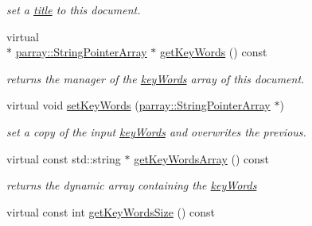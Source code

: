 \begin{DoxyCompactItemize}
\begin{DoxyCompactList}\small\item\em set a \hyperlink{classdocs_1_1Document_a419e4470c20e1bddd60448ba430f4738}{title} to this document. \end{DoxyCompactList}\item 
\hypertarget{classdocs_1_1Document_a500da2818240e2b29c1e4510b8724f4f}{virtual \\*
\hyperlink{classparray_1_1StringPointerArray}{parray\-::\-String\-Pointer\-Array} $\ast$ \hyperlink{classdocs_1_1Document_a500da2818240e2b29c1e4510b8724f4f}{get\-Key\-Words} () const }\label{classdocs_1_1Document_a500da2818240e2b29c1e4510b8724f4f}

\begin{DoxyCompactList}\small\item\em returns the manager of the \hyperlink{classdocs_1_1Document_a7539ac1430ded1f3a15f2532de8f0381}{key\-Words} array of this document. \end{DoxyCompactList}\item 
\hypertarget{classdocs_1_1Document_a99cde56ac7b8b230184b938cf55ce17e}{virtual void \hyperlink{classdocs_1_1Document_a99cde56ac7b8b230184b938cf55ce17e}{set\-Key\-Words} (\hyperlink{classparray_1_1StringPointerArray}{parray\-::\-String\-Pointer\-Array} $\ast$)}\label{classdocs_1_1Document_a99cde56ac7b8b230184b938cf55ce17e}

\begin{DoxyCompactList}\small\item\em set a copy of the input \hyperlink{classdocs_1_1Document_a7539ac1430ded1f3a15f2532de8f0381}{key\-Words} and overwrites the previous. \end{DoxyCompactList}\item 
\hypertarget{classdocs_1_1Document_a9b7139734ec394970161695e2e06c263}{virtual const std\-::string $\ast$ \hyperlink{classdocs_1_1Document_a9b7139734ec394970161695e2e06c263}{get\-Key\-Words\-Array} () const }\label{classdocs_1_1Document_a9b7139734ec394970161695e2e06c263}

\begin{DoxyCompactList}\small\item\em returns the dynamic array containing the \hyperlink{classdocs_1_1Document_a7539ac1430ded1f3a15f2532de8f0381}{key\-Words} \end{DoxyCompactList}\item 
\hypertarget{classdocs_1_1Document_a0af7d404eb347f27bc4e42b085aaa038}{virtual const int \hyperlink{classdocs_1_1Document_a0af7d404eb347f27bc4e42b085aaa038}{get\-Key\-Words\-Size} () const }\label{classdocs_1_1Document_a0af7d404eb347f27bc4e42b085aaa038}


\end{DoxyCompactItemize}
